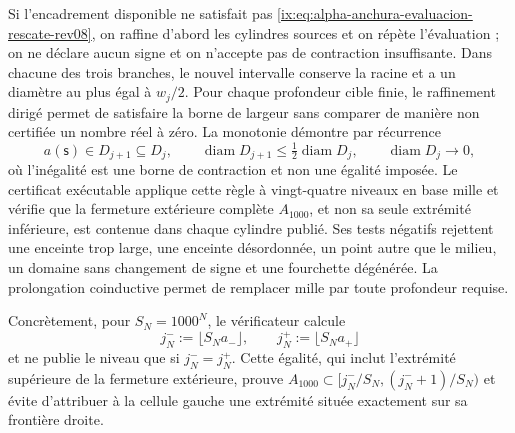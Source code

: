 Si l'encadrement disponible ne satisfait pas \eqref{ix:eq:alpha-anchura-evaluacion-rescate-rev08}, on raffine d'abord les cylindres sources et on répète l'évaluation ; on ne déclare aucun signe et on n'accepte pas de contraction insuffisante. Dans chacune des trois branches, le nouvel intervalle conserve la racine et a un diamètre au plus égal à \(w_j/2\). Pour chaque profondeur cible finie, le raffinement dirigé permet de satisfaire la borne de largeur sans comparer de manière non certifiée un nombre réel à zéro. La monotonie démontre par récurrence
\begin{equation}
 a(\mathsf s)\in D_{j+1}\subseteq D_j,\qquad
 \operatorname{diam}D_{j+1}\leq
 \tfrac12\operatorname{diam}D_j,
 \qquad \operatorname{diam}D_j\longrightarrow0,
 \label{ix:eq:alpha-biseccion-racional}
\end{equation}
où l'inégalité est une borne de contraction et non une égalité imposée.
Le certificat exécutable applique
cette règle à vingt-quatre niveaux en base mille et vérifie que la fermeture
extérieure complète \(A_{1000}\), et non sa seule extrémité inférieure, est contenue dans
chaque cylindre publié. Ses tests négatifs rejettent une enceinte trop
large, une enceinte désordonnée, un point autre que le milieu, un domaine sans
changement de signe et une fourchette dégénérée. La prolongation coinductive permet
de remplacer mille par toute profondeur requise.

Concrètement, pour \(S_N=1000^N\), le vérificateur calcule
\begin{equation}
 j_N^-:=\lfloor S_Na_-\rfloor,
 \qquad j_N^+:=\lfloor S_Na_+\rfloor
 \label{ix:eq:alpha-indices-cilindro-dirigidos-rev08}
\end{equation}
et ne publie le niveau que si \(j_N^-=j_N^+\). Cette égalité, qui inclut
l'extrémité supérieure de la fermeture extérieure, prouve
\(A_{1000}\subset[j_N^-/S_N,(j_N^-+1)/S_N)\) et évite d'attribuer à la cellule
gauche une extrémité située exactement sur sa frontière droite.

